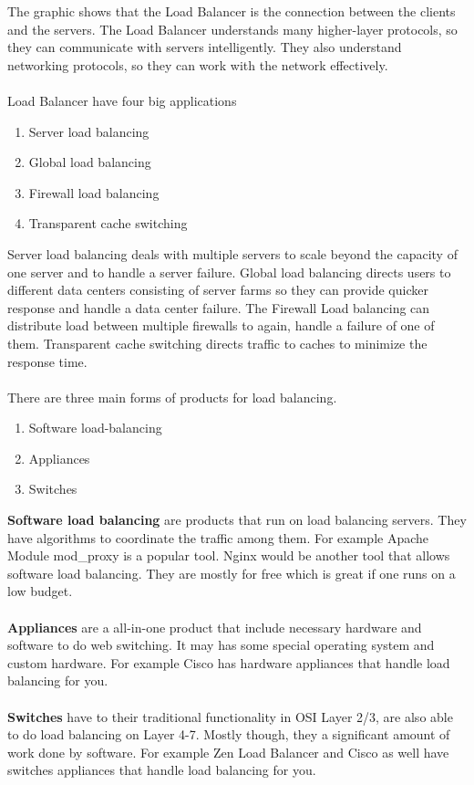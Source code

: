 \documentclass[12p]{article}
\begin{document}
	The graphic shows that the Load Balancer is the connection between the clients and the servers. The Load Balancer understands many higher-layer protocols, so they can communicate with servers intelligently. They also understand networking protocols, so they can work with the network effectively.\\\\
	Load Balancer have four big applications
	\begin{enumerate}
		\item Server load balancing
		\item Global load balancing
		\item Firewall load balancing
		\item Transparent cache switching
	\end{enumerate}
	Server load balancing deals with multiple servers to scale beyond the capacity of one server and to handle a server failure. Global load balancing directs users to different data centers consisting of server farms so they can provide quicker response and handle a data center failure. The Firewall Load balancing can distribute load between multiple firewalls to again, handle a failure of one of them. Transparent cache switching directs traffic to caches to minimize the response time. \\ \\
	There are three main forms of products for load balancing. 
	\begin{enumerate}
		\item Software load-balancing
		\item Appliances
		\item Switches
	\end{enumerate}
	\textbf{Software load balancing} are products that run on load balancing servers. They have algorithms to coordinate the traffic among them. For example Apache Module mod\_proxy is a popular tool. Nginx would be another tool that allows software load balancing. They are mostly for free which is great if one runs on a low budget.  \\\\ %
	\textbf{Appliances} are a all-in-one product that include necessary hardware and software to do web switching. It may has some special operating system and custom hardware. For example Cisco has hardware appliances that handle load balancing for you. \\\\ %
	\textbf{Switches} have to their traditional functionality in OSI Layer 2/3, are also able to do load balancing on Layer 4-7. Mostly though, they a significant amount of work done by software. For example Zen Load Balancer  and Cisco as well have switches  appliances that handle load balancing for you.
	
\end{document}
